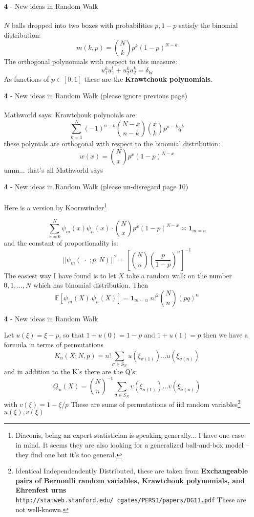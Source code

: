 \documentclass[12pt]{article}
\begin{document}
\newpage

\noindent \textbf{4} - New ideas in Random Walk \\ \\
$N$ balls dropped into two boxes with probabilities $p, 1-p$ satisfy the binomial distribution:
$$ m(k, p) = \binom{N}{k} p^k (1-p)^{N-k}$$
The orthogonal polynomials with respect to this measure:
$$ u_1^k u_1^l + u_2^k u_2^k = \delta_{kl} $$
As functions of $p \in [0,1]$ these are the \textbf{Krawtchouk polynomials}.  


\newpage

\noindent \textbf{4} - New ideas in Random Walk (please ignore previous page)\\ \\
Mathworld says: Krawtchouk polynoials are:
$$ \sum_{k=1}^N (-1)^{n-k} \binom{N-x}{n - k} \binom{x}{k}p^{n-k}q^k$$
these polynials are orthogonal with respect to the binomial distribution:
$$ w(x)= \binom{N}{x} p^x (1-p)^{N-x}$$
umm... that's all Mathworld says

\newpage

\noindent \textbf{4} - New ideas in Random Walk (please un-disregard page 10)\\ \\
Here is a version by Koornwinder\footnote{Diaconis, being an expert statistician is speaking generally...  I have one case in mind. It seems they are also looking for a generalized ball-and-box model -- they find one but it's too general.  }  

$$ \sum_{x=0}^N \psi_m(x) \psi_n(x) \cdot \binom{N}{x} p^x (1-p)^{N-x}
\asymp \mathbf{1}_{m=n} $$
and the constant of proportionality is:
$$||\psi_m( \;\cdot \;;p,N)||^2 = \left[ \binom{N}{n} \left( \frac{p}{1-p} \right)^n \right]^{-1}$$
The easiest way I have found is to let $X$ take a random walk on the number $0,1,\dots, N$ which has binomial distribution.  Then
$$ \mathbb{E}[\psi_m(X)\,\psi_n(X)] = \mathbf{1}_{m=n}\;  n!^2\binom{N}{n}(pq)^n$$

\newpage \textbf{4} - New ideas in Random Walk

Let $u(\xi) = \xi - p$, so that $1+u(0)= 1-p$ and $1+u(1)=p$ then we have a formula in terms of permutations
$$K_n(X; N, p) = n! \sum_{\sigma \in S_N} u(\xi_{\sigma(1)})\dots u(\xi_{\sigma(n)}) $$
and in addition to the K's there are the Q's:
$$Q_n(X) = \binom{N}{n}^{-1} \sum_{\sigma \in S_N} v(\xi_{\sigma(1)})\dots v(\xi_{\sigma(n)}) $$
with $v(\xi)= 1 - \xi/p$ These are sums of permutations of iid random variables\footnote{Identical Independendently Distributed, these are taken from \textbf{Exchangeable pairs of Bernoulli random variables, Krawtchouk polynomials, and Ehrenfest urns} \texttt{http://statweb.stanford.edu/~cgates/PERSI/papers/DG11.pdf}  These are not well-known.} $u(\xi), v(\xi)$
\end{document}
